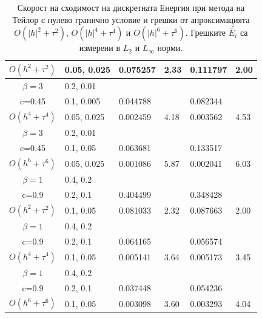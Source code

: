 \documentclass[a4paper]{article}
\theoremstyle{remark}
\begin{document}
\begin{large}
\begin{table}[ht]
\begin{tabular}{||c|l|ll|ll||}
 $O(h^2 + \tau^ 2)$ 	&0.05, 0.025  	& 0.075257 	& 2.33  	& 0.111797     	& 2.00      \\
\hline 
  $\beta=3$               &0.2, 0.01       	&                	&          	&                     	&      \\
   c=0.45                   &0.1, 0.005      	&0.044788 	&         	&0.082344   		&       \\
 $O(h^4+ \tau^4)$ &0.05, 0.025  		&0.002459 	&4.18    	&0.003562   		&4.53      \\
\hline 
  $\beta=3$               &0.2, 0.01       	&                	&          	&                 	&            \\
     c=0.45                 &0.1, 0.05        	&0.063681 	&          	&  0.133517  	&           \\
 $O(h^6+ \tau^6)$ &0.05, 0.025 		&0.001086 	& 5.87   	&  0.002041		&6.03   \\
\hline
\hline 
       $\beta=1$       	&0.4, 0.2     		&             	&           &           		&   \\
                  c=0.9    	&0.2, 0.1     		& 0.404499 	&           &0.348428 		&   \\
$O(h^2+ \tau^2)$ 	&0.1, 0.05   		& 0.081033  	&2.32  	&0.087663  		& 2.00 \\
\hline
      $\beta=1$           &0.4, 0.2    		&            	&        	&             		&    \\
       c=0.9                	&0.2, 0.1     		& 0.064165  	&        	&  0.056574   	&   \\
$O(h^4+ \tau^4)$ 	&0.1, 0.05   		&0.005141 	& 3.64  	& 0.005173  		& 3.45  \\
\hline
  $\beta=1$     	 	&0.4, 0.2   		&            	&         	&                  	&      \\
      c=0.9                 	&0.2, 0.1   		&0.037448	&         	& 0.054236      	&       \\
   $O(h^6+ \tau^6)$ &0.1, 0.05  		& 0.003098 	& 3.60 	& 0.003293  		& 4.04        \\
\hline
\hline 
		\end{tabular}
		\caption{Скорост на сходимост на дискретната Енергия при метода на Тейлор с нулево гранично условие и грешки от апроксимацията $O(|h|^{2} + \tau^2 )$, $O(|h|^{4} + \tau^4 )$ и $O(|h|^{6} + \tau^6 )$. Грешките $\bar{\bar E_i}$ са измерени в $L_2$ и $L_\infty$ норми.}
\label{tableB}
\end{table}


\end{large}
\end{document}
